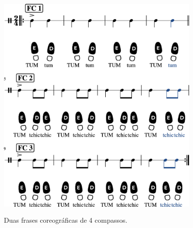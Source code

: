 \begin{figure}[!h]
    \centering
    \href{https://drive.google.com/file/d/1fGxjpEn_EFhG5DBS7El1CiHx-oy_Ibof/view?usp=sharing}{\includegraphics[width=0.9\textwidth]{chapters/cap-musicalidade/treino-fraseio2a-1.eps}}
    \caption{Duas frases coreográficas de 4 compassos.}
    \label{fig:frasecoreografica2a}
\end{figure}

